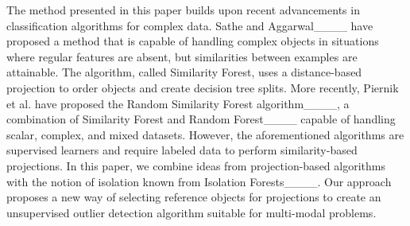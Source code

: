 The method presented in this paper builds upon recent advancements in classification algorithms for complex data. Sathe and Aggarwal____ have proposed a method that is capable of handling complex objects in situations where regular features are absent, but similarities between examples are attainable. The algorithm, called Similarity Forest, uses a distance-based projection to order objects and create decision tree splits. More recently, Piernik et al. have proposed the Random Similarity Forest algorithm____, a combination of Similarity Forest and Random Forest____ capable of handling scalar, complex, and mixed datasets. However, the aforementioned algorithms are supervised learners and require labeled data to perform similarity-based projections. In this paper, we combine ideas from projection-based algorithms with the notion of isolation known from Isolation Forests____. Our approach proposes a new way of selecting reference objects for projections to create an unsupervised outlier detection algorithm suitable for multi-modal problems.
